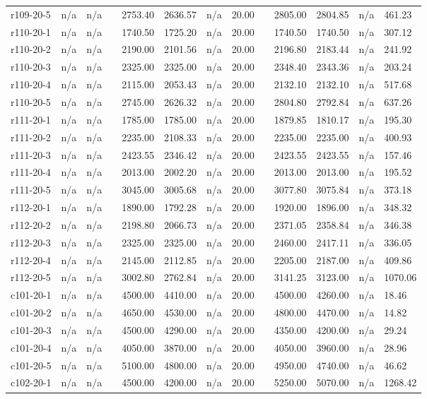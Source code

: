 \documentclass[final,5p,times,twocolumn]{elsarticle}
\begin{document}
{{{{{{{{{{{{{\begin{longtable}{l l l l l l l l l l l l l}
r109-20-5& n/a& n/a&&2753.40& 2636.57& n/a& 20.00&&2805.00& 2804.85& n/a& 461.23\\
r110-20-1& n/a& n/a&&1740.50& 1725.20& n/a& 20.00&&1740.50& 1740.50& n/a& 307.12\\
r110-20-2& n/a& n/a&&2190.00& 2101.56& n/a& 20.00&&2196.80& 2183.44& n/a& 241.92\\
r110-20-3& n/a& n/a&&2325.00& 2325.00& n/a& 20.00&&2348.40& 2343.36& n/a& 203.24\\
r110-20-4& n/a& n/a&&2115.00& 2053.43& n/a& 20.00&&2132.10& 2132.10& n/a& 517.68\\
r110-20-5& n/a& n/a&&2745.00& 2626.32& n/a& 20.00&&2804.80& 2792.84& n/a& 637.26\\
r111-20-1& n/a& n/a&&1785.00& 1785.00& n/a& 20.00&&1879.85& 1810.17& n/a& 195.30\\
r111-20-2& n/a& n/a&&2235.00& 2108.33& n/a& 20.00&&2235.00& 2235.00& n/a& 400.93\\
r111-20-3& n/a& n/a&&2423.55& 2346.42& n/a& 20.00&&2423.55& 2423.55& n/a& 157.46\\
r111-20-4& n/a& n/a&&2013.00& 2002.20& n/a& 20.00&&2013.00& 2013.00& n/a& 195.52\\
r111-20-5& n/a& n/a&&3045.00& 3005.68& n/a& 20.00&&3077.80& 3075.84& n/a& 373.18\\
r112-20-1& n/a& n/a&&1890.00& 1792.28& n/a& 20.00&&1920.00& 1896.00& n/a& 348.32\\
r112-20-2& n/a& n/a&&2198.80& 2066.73& n/a& 20.00&&2371.05& 2358.84& n/a& 346.38\\
r112-20-3& n/a& n/a&&2325.00& 2325.00& n/a& 20.00&&2460.00& 2417.11& n/a& 336.05\\
r112-20-4& n/a& n/a&&2145.00& 2112.85& n/a& 20.00&&2205.00& 2187.00& n/a& 409.86\\
r112-20-5& n/a& n/a&&3002.80& 2762.84& n/a& 20.00&&3141.25& 3123.00& n/a& 1070.06\\
c101-20-1& n/a& n/a&&4500.00& 4410.00& n/a& 20.00&&4500.00& 4260.00& n/a& 18.46\\
c101-20-2& n/a& n/a&&4650.00& 4530.00& n/a& 20.00&&4800.00& 4470.00& n/a& 14.82\\
c101-20-3& n/a& n/a&&4500.00& 4290.00& n/a& 20.00&&4350.00& 4200.00& n/a& 29.24\\
c101-20-4& n/a& n/a&&4050.00& 3870.00& n/a& 20.00&&4050.00& 3960.00& n/a& 28.96\\
c101-20-5& n/a& n/a&&5100.00& 4800.00& n/a& 20.00&&4950.00& 4740.00& n/a& 46.62\\
c102-20-1& n/a& n/a&&4500.00& 4200.00& n/a& 20.00&&5250.00& 5070.00& n/a& 1268.42\\

\end{longtable}}}}}}}}}}}}}}
\end{document}
